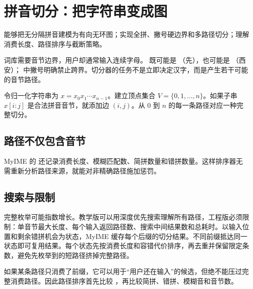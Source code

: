 \chapter{拼音切分：把字符串变成图}

\begin{goals}
能够把无分隔拼音建模为有向无环图；实现全拼、撇号硬边界和多路径切分；理解消费长度、路径排序与截断策略。
\end{goals}

词库需要音节边界，用户却通常输入连续字母。 既可能是 （先），也可能是 （西安）； 中撇号明确禁止跨界。切分器的任务不是立即决定汉字，而是产生若干可能的音节路径。

令归一化字符串为 \(x=x_0x_1\cdots x_{n-1}\)。建立顶点集合 \(V=\{0,1,\ldots,n\}\)。如果子串 \(x[i:j]\) 是合法拼音音节，就添加边 \((i,j)\)。从 0 到 \(n\) 的每一条路径对应一种完整切分。


\section{路径不仅包含音节}

MyIME 的  还记录消费长度、模糊匹配数、简拼数量和错拼数量。这样排序器无需重新分析路径来源，就能对非精确路径施加惩罚。



\section{搜索与限制}

完整枚举可能指数增长。教学版可以用深度优先搜索理解所有路径，工程版必须限制：单音节最大长度、每个输入返回路径数、搜索中间结果数和总耗时。以输入位置和剩余错拼机会为状态，MyIME 缓存每个后缀的切分结果。不同前缀抵达同一状态即可复用结果。每个状态先按消费长度和容错代价排序，再去重并保留限定条数，避免先枚举到的短路径挤掉完整路径。



如果某条路径只消费了前缀，它可以用于“用户还在输入”的候选，但绝不能压过完整消费路径。因此路径排序首先比较 ，再比较简拼、错拼、模糊音和音节数。

